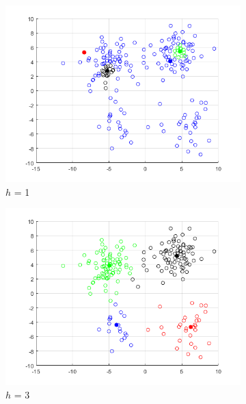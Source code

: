\documentclass[12pt]{article}
\begin{document}
\begin{figure}[H]
    \centering %
\begin{subfigure}{0.25\textwidth}
  \includegraphics[width=\linewidth]{figs/1-b-meanshift-a-7.png}
  \caption{$h$ = 1}
  \label{fig:1}
\end{subfigure}\hfil %
\begin{subfigure}{0.25\textwidth}
  \includegraphics[width=\linewidth]{figs/1-b-meanshift-a-3.png}
  \caption{$h$ = 3}
  \label{fig:2}
\end{subfigure}\hfil %
\begin{subfigure}{0.25\textwidth}

\end{subfigure}
\end{figure}
\end{document}
